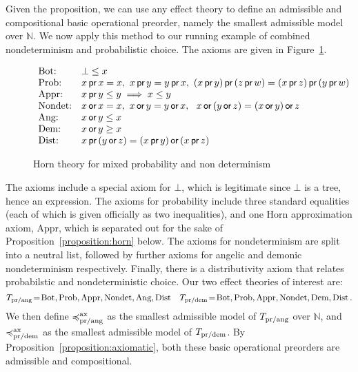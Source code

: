 Given the proposition, we can use any effect theory to define an admissible and compositional basic operational preorder, namely the smallest admissible model over $\mathbb{N}$. We now apply this method to our running example of combined nondeterminism and probabilistic choice. The  axioms are given in
Figure~\ref{fig:axiomsmixed}.
\begin{figure}[t]
\[
\begin{array}{ll}
\text{Bot:} & \bot \leq x
\\
\text{Prob:} & x \operatorname{\textsf{pr}} x = x , ~ x \operatorname{\textsf{pr}} y = y \operatorname{\textsf{pr}} x , ~ 
                                (x \operatorname{\textsf{pr}} y) \operatorname{\textsf{pr}}\, (z \operatorname{\textsf{pr}} w) = (x \operatorname{\textsf{pr}} z) \operatorname{\textsf{pr}}\, (y \operatorname{\textsf{pr}} w)
\\
\text{Appr:} & x \operatorname{\textsf{pr}} y \leq y \implies  x \leq y
 \\
\text{Nondet:} & x \operatorname{\textsf{or}} x = x, ~ x \operatorname{\textsf{or}} y = y \operatorname{\textsf{or}} x, ~ ~ x \operatorname{\textsf{or}}\, (y \operatorname{\textsf{or}} z) = (x \operatorname{\textsf{or}} y) \operatorname{\textsf{or}} z
\\
\text{Ang:} & x \operatorname{\textsf{or}} y \leq x \\ 
\text{Dem:} & x \operatorname{\textsf{or}} y \geq x \\ 
\text{Dist:} & x \operatorname{\textsf{pr}}\, (y \operatorname{\textsf{or}} z) = (x \operatorname{\textsf{pr}} y) \operatorname{\textsf{or}}\, (x \operatorname{\textsf{pr}} z)
\end{array}
\]
    \caption{Horn theory for mixed probability and non determinism}
    \label{fig:axiomsmixed}
\end{figure}

The axioms include a special axiom for $\bot$, which is legitimate since $\bot$ is a tree, hence an expression.
The axioms  for probability include three standard equalities (each of which is given officially as two inequalities), and one Horn approximation axiom, $\text{Appr}$, which  is separated out for the sake of Proposition~\ref{proposition:horn} below.
The axioms for nondeterminism are split into a neutral list,  followed by further axioms  for angelic and demonic nondeterminism respectively. Finally, there is a distributivity axiom that relates
probabilstic and nondeterministic choice. 
Our two effect theories of interest are: 
\[
T_{\text{pr/ang}} \!=\!  \text{Bot},  \text{Prob},  \text{Appr}, \text{Nondet}, \text{Ang},\text{Dist} \quad
T_{\text{pr/dem}}\! = \!\text{Bot},  \text{Prob},  \text{Appr},  \text{Nondet},  \text{Dem},\text{Dist}\,.
\]
We then define  $\preccurlyeq^{\text{ax}}_{\text{pr/ang}}$ as the smallest admissible model
of $T_{\text{pr/ang}}$ over $\mathbb{N}$, and 
$\preccurlyeq^{\text{ax}}_{\text{pr/dem}}$ as the smallest admissible model
of $T_{\text{pr/dem}}$. By Proposition~\ref{proposition:axiomatic}, both these basic operational preorders are admissible and compositional.

